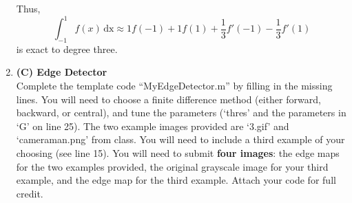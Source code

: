 \documentclass[12pt]{article}
\begin{document}
\begin{enumerate}[label=\bfseries Problem \arabic*:]
Thus, 
$$\int_{-1}^1 f(x) \,\text{dx} \approx 1 f(-1) + 1 f(1) + \frac{1}{3} f'(-1) - \frac{1}{3} f'(1) $$
 is exact to degree three.
\newpage 

 \item \textbf{(C) Edge Detector}\\
Complete the template code ``MyEdgeDetector.m'' by filling in the missing lines. You will need to choose a finite difference method (either forward, backward, or central), and tune the parameters (`thres' and the parameters in `G' on line 25).  The two example images provided are `3.gif' and `cameraman.png' from class. You will need to include a third example of your choosing (see line 15). You will need to submit \textbf{four images}: the edge maps for the two examples provided, the original grayscale image for your third example, and the edge map for the third example. Attach your code for full credit. 


\end{enumerate}
\end{document}
